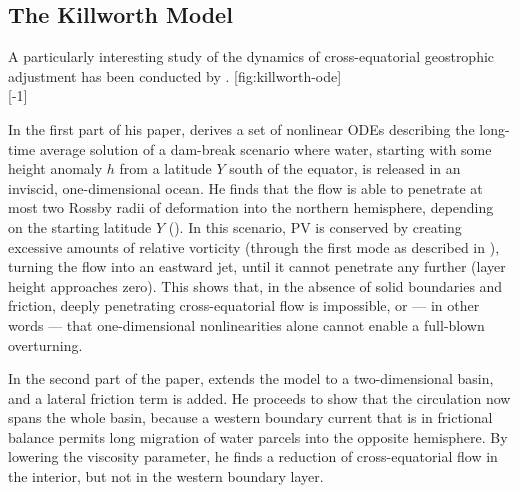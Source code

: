 \clearpage
\subsection{The Killworth Model}
\label{sec:killworth}
A particularly interesting study of the dynamics of cross-equatorial geostrophic adjustment has been conducted by  \citep{killworth}.
[fig:killworth-ode]%
{\\[2ex]%
}[-1]%

In the first part of his paper, \citeauthor{killworth} derives a set of nonlinear \acp{ODE} describing the long-time average solution of a dam-break scenario where water, starting with some height anomaly \(h\) from a latitude \(Y\) south of the equator, is released in an inviscid, one-dimensional ocean. He finds that the flow is able to penetrate at most two Rossby radii of deformation into the northern hemisphere, depending on the starting latitude \(Y\) (). In this scenario, \ac{PV} is conserved by creating excessive amounts of relative vorticity (\ie through the first mode as described in ), turning the flow into an eastward jet, until it cannot penetrate any further (layer height approaches zero). This shows that, in the absence of solid boundaries and friction, deeply penetrating cross-equatorial flow is impossible, or --- in other words --- that one-dimensional nonlinearities alone cannot enable a full-blown overturning.

In the second part of the paper, \citeauthor{killworth} extends the model to a two-dimensional basin, and a lateral friction term is added. He proceeds to show that the circulation now spans the whole basin, because a western boundary current that is in frictional balance permits long migration of water parcels into the opposite hemisphere. By lowering the viscosity parameter, he finds a reduction of cross-equatorial flow in the interior, but not in the western boundary layer.

